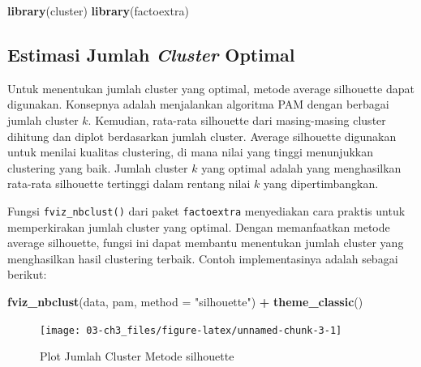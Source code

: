 \documentclass[
  oneside]{book}
\newenvironment{Shaded}{\begin{snugshade}}{\end{snugshade}}
\newcommand{\AttributeTok}[1]{\textcolor[rgb]{0.13,0.29,0.53}{#1}}
\newcommand{\FunctionTok}[1]{\textcolor[rgb]{0.13,0.29,0.53}{\textbf{#1}}}
\newcommand{\NormalTok}[1]{#1}
\newcommand{\SpecialCharTok}[1]{\textcolor[rgb]{0.81,0.36,0.00}{\textbf{#1}}}
\newcommand{\StringTok}[1]{\textcolor[rgb]{0.31,0.60,0.02}{#1}}
\begin{document}
\begin{Shaded}
\begin{Highlighting}[]
\FunctionTok{library}\NormalTok{(cluster)}
\FunctionTok{library}\NormalTok{(factoextra)}
\end{Highlighting}
\end{Shaded}

\subsection*{\texorpdfstring{Estimasi Jumlah \emph{Cluster} Optimal}{Estimasi Jumlah Cluster Optimal}}\label{estimasi-jumlah-cluster-optimal-1}

Untuk menentukan jumlah cluster yang optimal, metode average silhouette dapat digunakan. Konsepnya adalah menjalankan algoritma PAM dengan berbagai jumlah cluster \(k\). Kemudian, rata-rata silhouette dari masing-masing cluster dihitung dan diplot berdasarkan jumlah cluster. Average silhouette digunakan untuk menilai kualitas clustering, di mana nilai yang tinggi menunjukkan clustering yang baik. Jumlah cluster \(k\) yang optimal adalah yang menghasilkan rata-rata silhouette tertinggi dalam rentang nilai \(k\) yang dipertimbangkan.

Fungsi \texttt{fviz\_nbclust()} dari paket \texttt{factoextra} menyediakan cara praktis untuk memperkirakan jumlah cluster yang optimal. Dengan memanfaatkan metode average silhouette, fungsi ini dapat membantu menentukan jumlah cluster yang menghasilkan hasil clustering terbaik. Contoh implementasinya adalah sebagai berikut:

\begin{Shaded}
\begin{Highlighting}[]
\FunctionTok{fviz\_nbclust}\NormalTok{(data, pam, }\AttributeTok{method =} \StringTok{"silhouette"}\NormalTok{) }\SpecialCharTok{+}
  \FunctionTok{theme\_classic}\NormalTok{()}
\end{Highlighting}
\end{Shaded}

\begin{figure}[h]

{\centering \texttt{[image: 03-ch3\_files/figure-latex/unnamed-chunk-3-1]} 

}

\caption{Plot Jumlah Cluster Metode silhouette}\label{fig:unnamed-chunk-3}
\end{figure}
\end{document}
